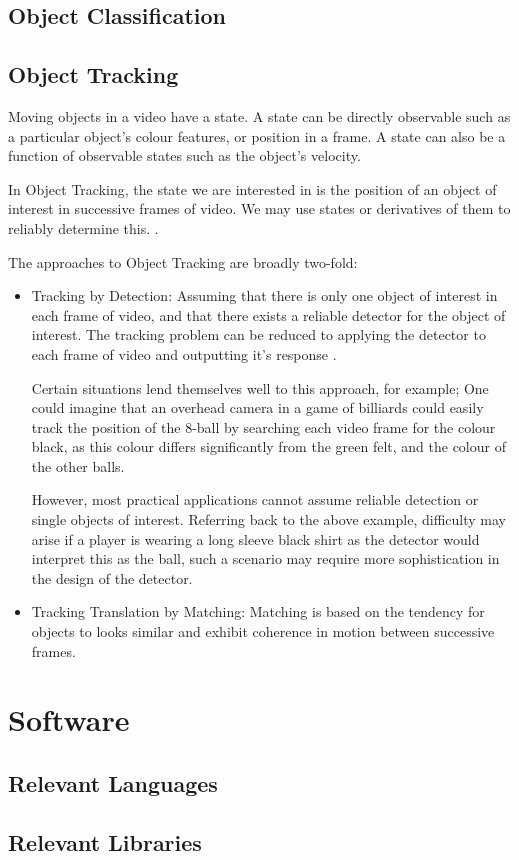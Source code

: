 \subsection{Object Classification}

\subsection{Object Tracking}
Moving objects in a video have a state. A state can be directly observable such as a
particular object's colour features, or position in a frame. A state can also be a function
of observable states such as the object's velocity.

In Object Tracking, the state we are interested in is the position of an object
of interest in successive frames of video. We may use states or derivatives of
them to reliably determine this. \cite{Forsyth2012}.

The approaches to Object Tracking are broadly two-fold:
\begin{itemize}
    \item Tracking by Detection:
        Assuming that there is only one object of interest in each frame of
        video, and that there exists a reliable detector for the object of
        interest. The tracking problem can be reduced to applying the detector
        to each frame of video and outputting it's response \cite{Forsyth2012}.

        Certain situations lend themselves well to this approach, for example;
        One could imagine that an overhead camera in a game of billiards could
        easily track the position of the 8-ball by searching each video frame
        for the colour black, as this colour differs significantly from the
        green felt, and the colour of the other balls.
        
        However, most practical applications cannot assume reliable detection or
        single objects of interest. Referring back to the above example,
        difficulty may arise if a player is wearing a long sleeve black shirt as
        the detector would interpret this as the ball, such a scenario may
        require more sophistication in the design of the detector.

    \item Tracking Translation by Matching:
        Matching is based on the tendency for objects to looks similar and
        exhibit coherence in motion between successive frames.
       
        


\end{itemize}   

\cite{Forsyth2012}


\section{Software}

\subsection{Relevant Languages}
\subsection{Relevant Libraries}




